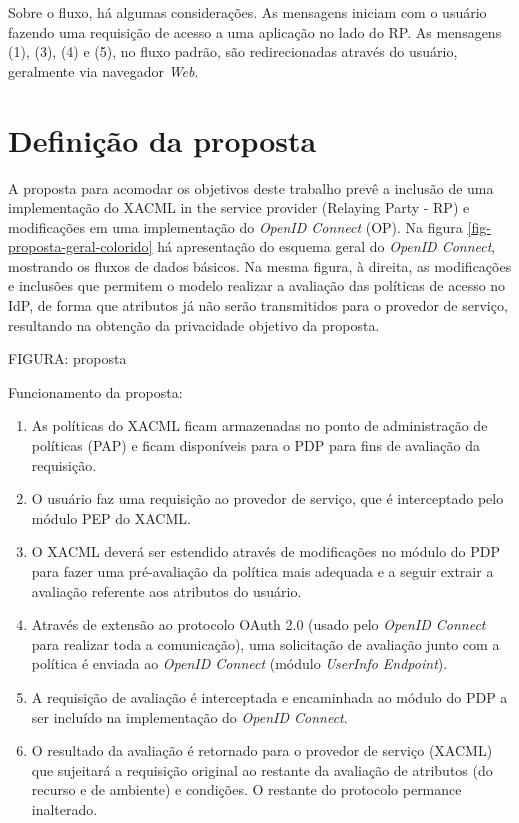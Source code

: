 \documentclass{doublecol-new}
\begin{document}
Sobre o fluxo, há algumas considerações. As mensagens iniciam com o usuário fazendo uma requisição de acesso a uma aplicação no lado do RP. As mensagens (1), (3), (4) e (5), no fluxo padrão, são redirecionadas através do usuário, geralmente via navegador \textit{Web}.

\section{Definição da proposta}

A proposta para acomodar os objetivos deste trabalho prevê a inclusão de uma implementação do XACML in the service provider (Relaying Party - RP) e modificações em uma implementação do \textit{OpenID Connect} (OP). Na figura \ref{fig-proposta-geral-colorido} há apresentação do esquema geral do \textit{OpenID Connect}, mostrando os fluxos de dados básicos. Na mesma figura, à direita, as modificações e inclusões que permitem o modelo realizar a avaliação das políticas de acesso no IdP, de forma que atributos já não serão transmitidos para o provedor de serviço, resultando na obtenção da privacidade objetivo da proposta. 

FIGURA: proposta

Funcionamento da proposta: 
\begin{enumerate}
	\item As políticas do XACML ficam armazenadas no ponto de administração de políticas (PAP) e ficam disponíveis para o PDP para fins de avaliação da requisição.
	\item O usuário faz uma requisição ao provedor de serviço, que é interceptado pelo módulo PEP do XACML.
	\item O XACML deverá ser estendido através de modificações no módulo do PDP para fazer uma pré-avaliação da política mais adequada e a seguir extrair a avaliação referente aos atributos do usuário.
	\item Através de extensão ao protocolo OAuth 2.0 (usado pelo \textit{OpenID Connect} para realizar toda a comunicação), uma solicitação de avaliação junto com a política é enviada ao \textit{OpenID Connect} (módulo \textit{UserInfo Endpoint}).
	\item A requisição de avaliação é interceptada e encaminhada ao módulo do PDP a ser incluído na implementação do \textit{OpenID Connect}.
	\item O resultado da avaliação é retornado para o provedor de serviço (XACML) que sujeitará a requisição original ao restante da avaliação de atributos (do recurso e de ambiente) e condições. O restante do protocolo permance inalterado.
\end{enumerate}   
\end{document}
